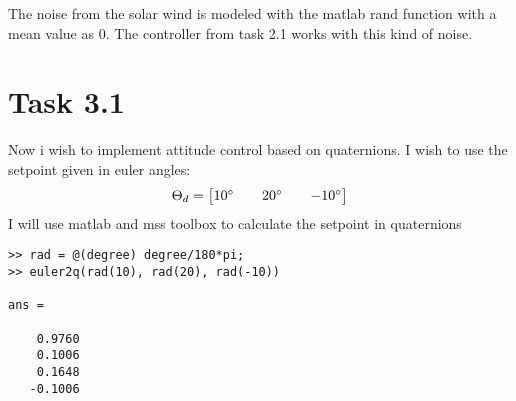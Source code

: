 \documentclass[11pt]{article}
\begin{document}
The noise from the solar wind is modeled with the matlab rand function with a mean value as 0. The controller from task 2.1 works with this kind of noise.


\section*{Task 3.1}
Now i wish to implement attitude control based on quaternions. I wish to use the setpoint given in euler angles:
\[\Theta_d = \begin{bmatrix} 10\degree && 20\degree && -10\degree \end{bmatrix} \]
I will use matlab and mss toolbox to calculate the setpoint in quaternions
\begin{lstlisting}[frame=single]
>> rad = @(degree) degree/180*pi;
>> euler2q(rad(10), rad(20), rad(-10))

ans =

    0.9760
    0.1006
    0.1648
   -0.1006

\end{lstlisting}
\end{document}
